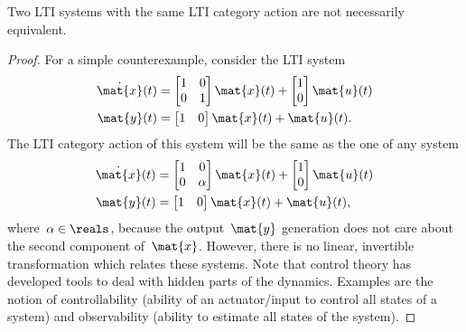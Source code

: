 \begin{remark}
    Two LTI systems with the same LTI category action are not necessarily equivalent.
\end{remark}
\begin{proof}
    For a simple counterexample, consider the LTI system
    \begin{equation*}
        \begin{aligned}
            \dot{\mat{x}}(t) & =\begin{bmatrix} 1&0\\ 0&1 \end{bmatrix} \mat{x}(t)+\begin{bmatrix} 1\\ 0\end{bmatrix} \mat{u}(t) \\
            \mat{y}(t)       & =\begin{bmatrix} 1&0\end{bmatrix} \mat{x}(t)+\mat{u}(t).
        \end{aligned}
    \end{equation*}
    The LTI category action of this system will be the same as the one of any system
    \begin{equation*}
        \begin{aligned}
            \dot{\mat{x}}(t) & =\begin{bmatrix} 1&0\\ 0&\alpha \end{bmatrix} \mat{x}(t)+\begin{bmatrix} 1\\ 0\end{bmatrix} \mat{u}(t) \\
            \mat{y}(t)       & =\begin{bmatrix} 1&0\end{bmatrix} \mat{x}(t)+\mat{u}(t),
        \end{aligned}
    \end{equation*}
    where~$\alpha \in \reals$, because the output~$\mat{y}$ generation does not care about the second component of~$\mat{x}$.
    However, there is no linear, invertible transformation which relates these systems.
    Note that control theory has developed tools to deal with hidden parts of the dynamics.
    Examples are the notion of controllability (ability of an actuator/input to control all states of a system) and observability (ability to estimate all states of the system).
\end{proof}

